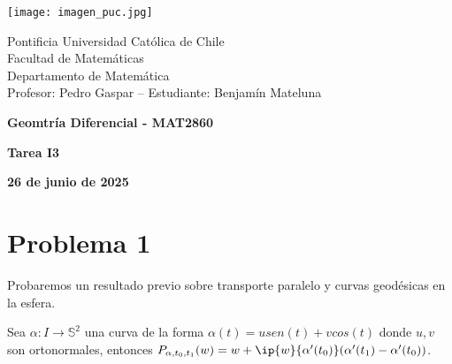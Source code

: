 \documentclass{article}
\begin{document}
\begin{minipage}{2.5cm}
    \texttt{[image: imagen\_puc.jpg]}
\end{minipage}
\begin{minipage}{14cm}
    {\sc Pontificia Universidad Católica de Chile\\
    Facultad de Matemáticas\\
    Departamento de Matemática\\
    Profesor: Pedro Gaspar -- Estudiante: Benjamín Mateluna}
\end{minipage}
\vspace{1ex}

{\centerline{\bf Geomtría Diferencial - MAT2860}
\centerline{\bf Tarea I3}}
\centerline{\bf 26 de junio de 2025}

\section*{Problema 1}
\noindent Probaremos un resultado previo sobre transporte paralelo y curvas geodésicas en la 
esfera.
\begin{lema}
    Sea $\alpha:I\to\mathbb{S}^{2}$ una curva de la forma $\alpha(t)=usen(t)+vcos(t)$ donde $u,v$ 
    son ortonormales, entonces $P_{\alpha,t_{0},t_{1}}(w)=w+\ip{w}{\alpha'(t_{0})}(\alpha'(t_{1})
    -\alpha'(t_{0}))$.
\end{lema}
\end{document}
